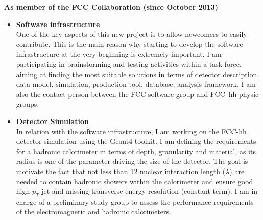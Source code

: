 \documentclass[12pt]{article}
\begin{document}
\vskip 0.5cm
\hskip 0.1cm {\bf As member of the FCC Collaboration (since October 2013)}\\
\begin{itemize}[leftmargin=1.3cm]
\itemsep0.8em


\item[] {\bf Software infrastructure}\\
One of the key aspects of this new project is to allow newcomers to easily contribute. This is the main reason why starting to develop the software infrastructure 
at the very beginning is extremely important. 
I am participating in brainstorming and testing activities within a task force, aiming at finding the most suitable solutions in terms of detector description, 
data model, simulation, production tool, database, analysis framework. I am also the contact person between the FCC software group and FCC--hh physic groups.



\item[] {\bf Detector Simulation}\\
In relation with the software infrastructure, I am working on the FCC-hh detector simulation using the Geant4 toolkit. 
I am defining the requirements for a hadronic calorimeter in terms of depth, granularity and material, as its radius is one of the parameter driving the size of the detector.
The goal is motivate the fact that not less than 12 nuclear interaction length ($\lambda$) are needed to contain hadronic showers within the calorimeter and ensure 
good high $p_T$  jet and missing transverse energy resolution (constant term). I am in charge of a preliminary study group to assess the performance requirements of the electromagnetic 
and hadronic calorimeters.


\end{itemize}
\end{document}
